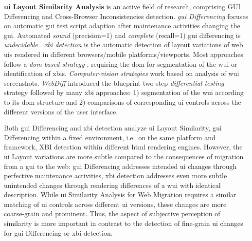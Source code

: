\textbf{\gls{ui} Layout Similarity Analysis} is an active field of research, comprising GUI Differencing and Cross-Browser Inconsistencies detection.
\emph{\gls{gui} Differencing} \autocite{Grechanik2018,Grechanik2009ICSE,Grechanik2009ICSM} focuses on automatic \gls{gui} test script adaption after maintenance activities changing the \gls{gui}.
Automated \emph{sound} (precision=1) and \emph{complete} (recall=1) \gls{gui} differencing is \emph{undecidable} \autocite{Grechanik2018}.
\emph{\gls{xbi} detection} is the automatic detection of layout variations of \gls{web} \glspl{ui} rendered in different browsers/mobile platforms/viewports.
Most approaches follow a \emph{\gls{dom}-based strategy} \autocite{Watanabe2018,RoyChoudhary2014XPERT,RoyChoudhary2010WebDiff}, requiring the \gls{dom} for segmentation of the \gls{wui} or identification of \glspl{xbi}.
\emph{Computer-vision strategies} \autocite{Saar2016Browserbite} work based on analysis of \gls{wui} screenshots.
\emph{WebDiff} \autocite{RoyChoudhary2010WebDiff} introduced the blueprint two-step \emph{differential testing} \autocite{Mckeeman1998DifferentialTesting} strategy followed by many \gls{xbi} approaches: 1) segmentation of the \gls{wui} according to its \gls{dom} structure and 2) comparisons of corresponding \gls{ui} controls across the different versions of the user interface.

Both \gls{gui} Differencing and \gls{xbi} detection analyze \gls{ui} Layout Similarity, \gls{gui} Differencing within a fixed environment, i.e.~on the same platform and framework, XBI detection within different \gls{html} rendering engines.
However, the \gls{ui} Layout variations are more subtle compared to the consequences of migration from a  \gls{gui} to the \gls{web}: \gls{gui} Differencing addresses intended \gls{ui} changes through perfective maintenance activities, \gls{xbi} detection addresses even more subtle unintended changes through rendering differences of a \gls{wui} with identical description.
While \gls{ui} Similarity Analysis for \gls{Web Migration} requires a similar matching of \gls{ui} controls across different \gls{ui} versions, these changes are more coarse-grain and prominent.
Thus, the aspect of subjective perception of similarity is more important in contrast to the detection of fine-grain \gls{ui} changes for \gls{gui} Differencing or \gls{xbi} detection.


